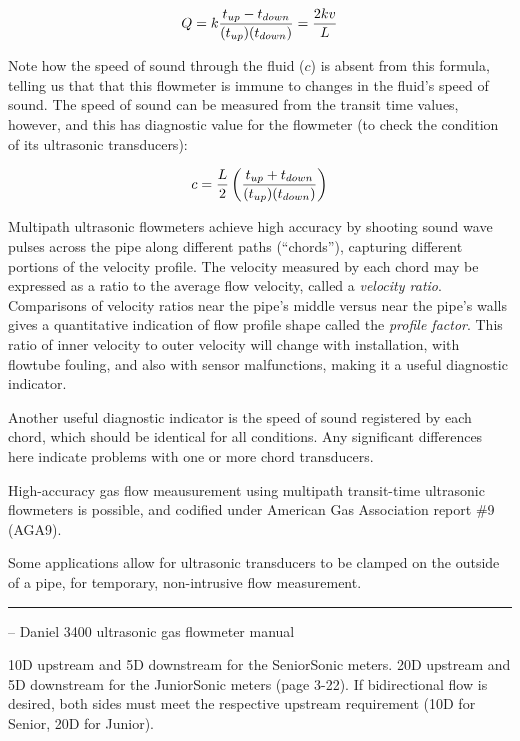 $$Q = k {t_{up} - t_{down} \over (t_{up})(t_{down})} = {2 k v \over L}$$

Note how the speed of sound through the fluid ($c$) is absent from this formula, telling us that that this flowmeter is immune to changes in the fluid's speed of sound.  The speed of sound can be measured from the transit time values, however, and this has diagnostic value for the flowmeter (to check the condition of its ultrasonic transducers):

$$c = {L \over 2} \left({t_{up} + t_{down} \over (t_{up})(t_{down})}\right)$$

Multipath ultrasonic flowmeters achieve high accuracy by shooting sound wave pulses across the pipe along different paths (``chords''), capturing different portions of the velocity profile.  The velocity measured by each chord may be expressed as a ratio to the average flow velocity, called a {\it velocity ratio}.  Comparisons of velocity ratios near the pipe's middle versus near the pipe's walls gives a quantitative indication of flow profile shape called the {\it profile factor}.  This ratio of inner velocity to outer velocity will change with installation, with flowtube fouling, and also with sensor malfunctions, making it a useful diagnostic indicator.

Another useful diagnostic indicator is the speed of sound registered by each chord, which should be identical for all conditions.  Any significant differences here indicate problems with one or more chord transducers.

\vskip 10pt

High-accuracy gas flow meausurement using multipath transit-time ultrasonic flowmeters is possible, and codified under American Gas Association report \#9 (AGA9).

\vskip 10pt

Some applications allow for ultrasonic transducers to be clamped on the outside of a pipe, for temporary, non-intrusive flow measurement.


\filbreak \vskip 5pt \hrule \vskip 5pt  -- Daniel 3400 ultrasonic gas flowmeter manual \vskip 10pt

10D upstream and 5D downstream for the SeniorSonic meters.  20D upstream and 5D downstream for the JuniorSonic meters (page 3-22).  If bidirectional flow is desired, both sides must meet the respective upstream requirement (10D for Senior, 20D for Junior).

